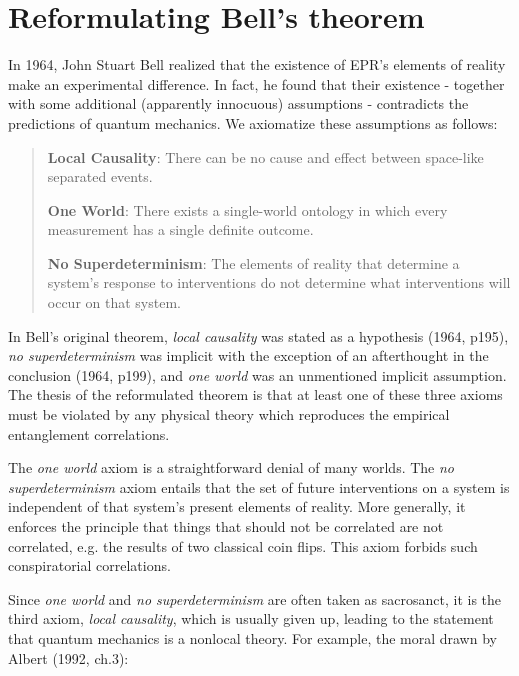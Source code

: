 \documentclass[a4paper]{article}
\begin{document}
\section{Reformulating Bell's theorem} \label{Bell}

In 1964, John Stuart Bell realized that the existence of EPR's elements of reality make an experimental difference. In fact, he found that their existence - together with some additional (apparently innocuous) assumptions - contradicts the predictions of quantum mechanics. We axiomatize these assumptions as follows:

\begin{quote}

\textbf{Local Causality}: There can be no cause and effect between space-like separated events.

\textbf{One World}: There exists a single-world ontology in which every measurement has a single definite outcome.

\textbf{No Superdeterminism}: The elements of reality that determine a system's response to interventions do not determine what interventions will occur on that system. 

\end{quote}

In Bell's original theorem, \textit{local causality} was stated as a hypothesis (1964, p195), \textit{no superdeterminism} was implicit with the exception of an afterthought in the conclusion (1964, p199), and \textit{one world} was an unmentioned implicit assumption. The thesis of the reformulated theorem is that at least one of these three axioms must be violated by any physical theory which reproduces the empirical entanglement correlations.

The \textit{one world} axiom is a straightforward denial of many worlds.  The \textit{no superdeterminism} axiom entails that the set of future interventions on a system is independent of that system's present elements of reality. More generally, it enforces the principle that things that should not be correlated are not correlated, e.g. the results of two classical coin flips. This axiom forbids such conspiratorial correlations. 

Since \textit{one world} and \textit{no superdeterminism} are often taken as sacrosanct, it is the third axiom, \textit{local causality}, which is usually given up, leading to the statement that quantum mechanics is a nonlocal theory. For example, the moral drawn by Albert (1992, ch.3):
\end{document}
